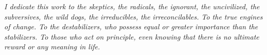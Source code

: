 \begin{dedicatoria}[] %
\vspace*{\fill} %
\centering
\textit{I dedicate this work to the skeptics, the radicals, the ignorant, the uncivilized, the subversives, the wild dogs, the irreducibles, the irreconcilables. To the true engines of change. To the destabilizers, who possess equal or greater importance than the stabilizers. To those who act on principle, even knowing that there is no ultimate reward or any meaning in life.}
\vspace*{\fill} %
\vspace{4.5cm}
\end{dedicatoria}


